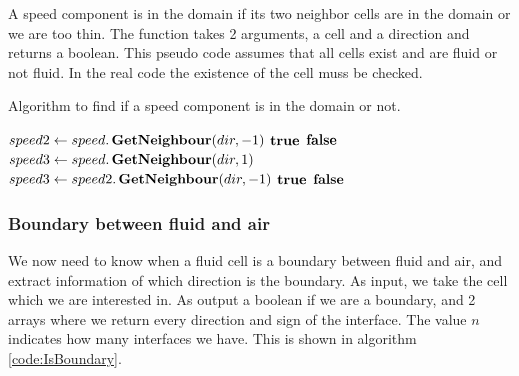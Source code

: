 A speed component is in the domain if its two neighbor cells are in the domain or we are too thin.
The function takes 2 arguments, a cell and a direction and returns a boolean.
This pseudo code assumes that all cells exist and are fluid or not fluid.
In the real code the existence of the cell muss be checked.

\begin{algorithm}
\caption{Algorithm to find if a speed component is in the domain or not.}\label{euclid}
\begin{algorithmic}[1]
\State $speed2\gets speed.\mathop{\textbf{GetNeighbour}}(dir,-1)$
\State \Return $\mathop{\textbf{true}}$
\EndIf
{}
\State \Return $\mathop{\textbf{false}}$
\EndIf
\State {}
\State $speed3\gets speed.\mathop{\textbf{GetNeighbour}}(dir,1)$ 
\State $speed3\gets speed2.\mathop{\textbf{GetNeighbour}}(dir,-1)$
\EndIf
{}
\State \Return $\mathop{\textbf{true}}$
\EndIf
\State \Return $\mathop{\textbf{false}}$
\EndFunction
\end{algorithmic}
\end{algorithm}

\subsubsection{ Boundary between fluid and air}

We now need to know when a fluid cell is a boundary between fluid and air, and extract information of which direction is the boundary.
As input, we take the cell which we are interested in.
As output a boolean if we are a boundary, and 2 arrays where we return every direction and sign of the interface.
The value $n$ indicates how many interfaces we have.
This is shown in algorithm \ref{code:IsBoundary}.

